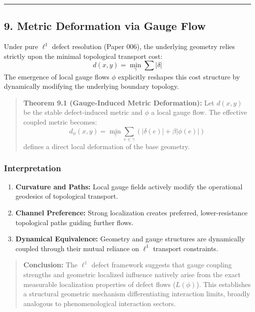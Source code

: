 \documentclass[
]{article}
\providecommand{\tightlist}{%
  \setlength{\itemsep}{0pt}\setlength{\parskip}{0pt}}
\begin{document}
\begin{center}\rule{0.5\linewidth}{0.5pt}\end{center}

\subsection{9. Metric Deformation via Gauge
Flow}\label{metric-deformation-via-gauge-flow}

Under pure \(\ell^1\) defect resolution (Paper 006), the underlying
geometry relies strictly upon the minimal topological transport cost:
\[ d(x,y) = \min_{\gamma} \sum |\delta| \] The emergence of local gauge
flows \(\phi\) explicitly reshapes this cost structure by dynamically
modifying the underlying boundary topology.

\begin{quote}
\textbf{Theorem 9.1 (Gauge-Induced Metric Deformation):} Let \(d(x,y)\)
be the stable defect-induced metric and \(\phi\) a local gauge flow. The
effective coupled metric becomes:
\[ d_\phi(x,y) = \min_{\gamma} \sum_{e \in \gamma} \left(|\delta(e)| + \beta |\phi(e)|\right) \]
defines a direct local deformation of the base geometry.
\end{quote}

\subsubsection{Interpretation}\label{interpretation-2}

\begin{enumerate}
\def\labelenumi{\arabic{enumi}.}
\tightlist
\item
  \textbf{Curvature and Paths:} Local gauge fields actively modify the
  operational geodesics of topological transport.
\item
  \textbf{Channel Preference:} Strong localization creates preferred,
  lower-resistance topological paths guiding further flows.
\item
  \textbf{Dynamical Equivalence:} Geometry and gauge structures are
  dynamically coupled through their mutual reliance on \(\ell^1\)
  transport constraints.
\end{enumerate}

\begin{quote}
\textbf{Conclusion:} The \(\ell^1\) defect framework suggests that gauge
coupling strengths and geometric localized influence natively arise from
the exact measurable localization properties of defect flows
(\(L(\phi)\)). This establishes a structural geometric mechanism
differentiating interaction limits, broadly analogous to
phenomenological interaction sectors.
\end{quote}
\end{document}
